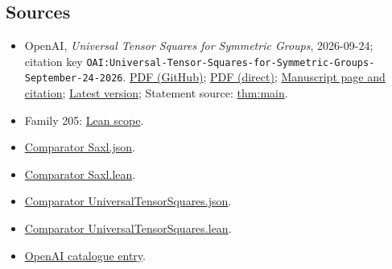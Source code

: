 \documentclass[11pt]{article}
\begin{document}
\subsection{Sources}
\begin{itemize}
\item OpenAI, \emph{Universal Tensor Squares for Symmetric Groups}, 2026-09-24; citation key \texttt{OAI:Universal-Tensor-Squares-for-Symmetric-Groups-September-24-2026}. \href{https://github.com/openai/math/blob/adc7f1241b42e322a6451854ab7e4b4c146bf78a/preprints/Universal-Tensor-Squares-for-Symmetric-Groups-September-24-2026/main.pdf}{PDF (GitHub)}; \href{https://github.com/openai/math/raw/adc7f1241b42e322a6451854ab7e4b4c146bf78a/preprints/Universal-Tensor-Squares-for-Symmetric-Groups-September-24-2026/main.pdf}{PDF (direct)}; \href{https://github.com/openai/math/blob/adc7f1241b42e322a6451854ab7e4b4c146bf78a/preprints/Universal-Tensor-Squares-for-Symmetric-Groups-September-24-2026/README.md}{Manuscript page and citation}; \href{https://github.com/openai/math/blob/main/preprints/Universal-Tensor-Squares-for-Symmetric-Groups-September-24-2026/main.pdf}{Latest version}; Statement source: \href{https://github.com/openai/math/blob/adc7f1241b42e322a6451854ab7e4b4c146bf78a/preprints/Universal-Tensor-Squares-for-Symmetric-Groups-September-24-2026/build/sections/introduction.tex\#L14}{thm:main}.
\item Family 205: \href{https://github.com/openai/math/blob/adc7f1241b42e322a6451854ab7e4b4c146bf78a/lean/docs/205.md}{Lean scope}.
\item \href{https://github.com/openai/math/blob/adc7f1241b42e322a6451854ab7e4b4c146bf78a/lean/ComparatorChallenges/Saxl.json}{Comparator Saxl.json}.
\item \href{https://github.com/openai/math/blob/adc7f1241b42e322a6451854ab7e4b4c146bf78a/lean/ComparatorChallenges/Saxl.lean}{Comparator Saxl.lean}.
\item \href{https://github.com/openai/math/blob/adc7f1241b42e322a6451854ab7e4b4c146bf78a/lean/ComparatorChallenges/UniversalTensorSquares.json}{Comparator UniversalTensorSquares.json}.
\item \href{https://github.com/openai/math/blob/adc7f1241b42e322a6451854ab7e4b4c146bf78a/lean/ComparatorChallenges/UniversalTensorSquares.lean}{Comparator UniversalTensorSquares.lean}.
\item \href{https://github.com/openai/math/blob/adc7f1241b42e322a6451854ab7e4b4c146bf78a/CONTENTS.md}{OpenAI catalogue entry}.
\end{itemize}
\end{document}
